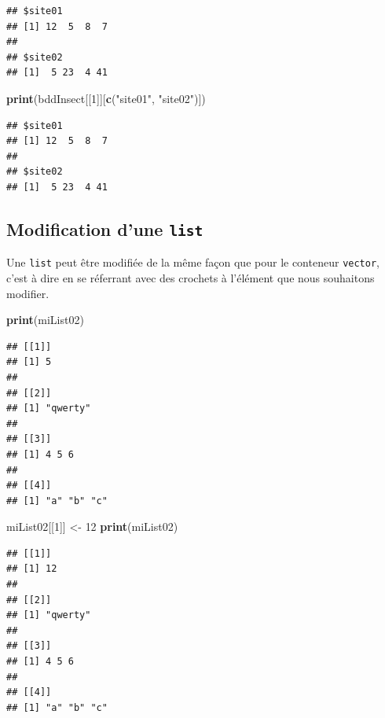 \documentclass[]{book}
\newenvironment{Shaded}{\begin{snugshade}}{\end{snugshade}}
\newcommand{\DecValTok}[1]{\textcolor[rgb]{0.00,0.00,0.81}{#1}}
\newcommand{\KeywordTok}[1]{\textcolor[rgb]{0.13,0.29,0.53}{\textbf{#1}}}
\newcommand{\NormalTok}[1]{#1}
\newcommand{\StringTok}[1]{\textcolor[rgb]{0.31,0.60,0.02}{#1}}
\begin{document}
\begin{verbatim}
## $site01
## [1] 12  5  8  7
## 
## $site02
## [1]  5 23  4 41
\end{verbatim}

\begin{Shaded}
\begin{Highlighting}[]
\KeywordTok{print}\NormalTok{(bddInsect[[}\DecValTok{1}\NormalTok{]][}\KeywordTok{c}\NormalTok{(}\StringTok{"site01"}\NormalTok{, }\StringTok{"site02"}\NormalTok{)])}
\end{Highlighting}
\end{Shaded}

\begin{verbatim}
## $site01
## [1] 12  5  8  7
## 
## $site02
## [1]  5 23  4 41
\end{verbatim}

\hypertarget{modification-dune-list}{%
\subsection{\texorpdfstring{Modification d'une \texttt{list}}{Modification d'une list}}\label{modification-dune-list}}

Une \texttt{list} peut être modifiée de la même façon que pour le conteneur \texttt{vector}, c'est à dire en se réferrant avec des crochets à l'élément que nous souhaitons modifier.

\begin{Shaded}
\begin{Highlighting}[]
\KeywordTok{print}\NormalTok{(miList02)}
\end{Highlighting}
\end{Shaded}

\begin{verbatim}
## [[1]]
## [1] 5
## 
## [[2]]
## [1] "qwerty"
## 
## [[3]]
## [1] 4 5 6
## 
## [[4]]
## [1] "a" "b" "c"
\end{verbatim}

\begin{Shaded}
\begin{Highlighting}[]
\NormalTok{miList02[[}\DecValTok{1}\NormalTok{]] <-}\StringTok{ }\DecValTok{12}
\KeywordTok{print}\NormalTok{(miList02)}
\end{Highlighting}
\end{Shaded}

\begin{verbatim}
## [[1]]
## [1] 12
## 
## [[2]]
## [1] "qwerty"
## 
## [[3]]
## [1] 4 5 6
## 
## [[4]]
## [1] "a" "b" "c"
\end{verbatim}
\end{document}
